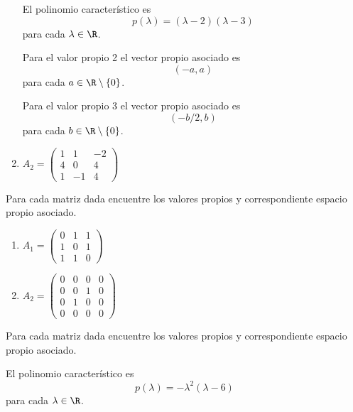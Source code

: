 \documentclass[10pt,a4]{examenEPN}
\begin{document}
\begin{preguntas}
\begin{multicols}{2}
\begin{enumerate}
\begin{respuesta}\hspace{0pt} El polinomio característico es
\[
    p(\lambda) = (\lambda - 2)(\lambda - 3)
\]
para cada $\lambda\in\R$. 

Para el valor propio 2 el vector propio asociado es
\[
    (-a, a)
\]
para cada $a\in\R\setminus\{0\}$.

Para el valor propio 3 el vector propio asociado es
\[
    (-b/2, b)
\]
para cada $b\in\R\setminus\{0\}$.
\end{respuesta}
\item $A_{2} = \begin{pmatrix}1&1&-2\\4&0&4\\1&-1&4\end{pmatrix}$

\end{enumerate}
\end{multicols}


\item Para cada matriz dada encuentre los valores  propios y correspondiente espacio propio asociado.
\begin{multicols}{2}
\begin{enumerate}

\item $A_{1} = \begin{pmatrix}0&1&1\\1&0&1\\1&1&0\end{pmatrix}$
\item $A_{2} = \begin{pmatrix}0&0&0&0\\0&0&1&0\\0&1&0&0\\0&0&0&0\end{pmatrix}$
\end{enumerate}
\end{multicols}
\item Para cada matriz dada encuentre los valores  propios y correspondiente espacio propio asociado.
\begin{multicols}{2}
\begin{enumerate}


\begin{respuesta}\hspace{0pt} El polinomio característico es
\[
    p(\lambda) = - \lambda^{2}(\lambda - 6)
\]
para cada $\lambda\in\R$. 


\end{respuesta}
\end{enumerate}
\end{multicols}
\end{preguntas}
\end{document}
